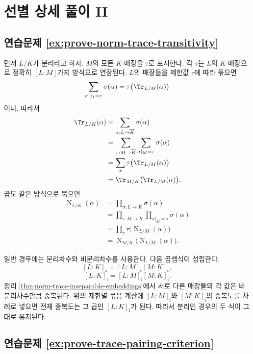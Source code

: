 \clearpage
\section{선별 상세 풀이 II}
\label{sec:norm-trace-solutions-b}

\subsection*{연습문제 \ref{ex:prove-norm-trace-transitivity}}

\begin{solution}
먼저 $L/K$가 분리라고 하자. $M$의 모든 $K$-매장을 $\tau$로 표시한다. 각 $\tau$는 $L$의 $K$-매장으로 정확히 $[L:M]$가지 방식으로 연장된다. $L$의 매장들을 제한값 $\tau$에 따라 묶으면
\[
  \sum_{\sigma|_M=\tau}\sigma(\alpha)
  =\tau\bigl(\Tr_{L/M}(\alpha)\bigr)
\]
이다. 따라서
\[
\begin{aligned}
  \Tr_{L/K}(\alpha)
  &=\sum_{\sigma:L\to\overline K}\sigma(\alpha)\\
  &=\sum_{\tau:M\to\overline K}
    \sum_{\sigma|_M=\tau}\sigma(\alpha)\\
  &=\sum_\tau\tau\bigl(\Tr_{L/M}(\alpha)\bigr)\\
  &=\Tr_{M/K}\bigl(\Tr_{L/M}(\alpha)\bigr).
\end{aligned}
\]
곱도 같은 방식으로 묶으면
\[
\begin{aligned}
  \operatorname N_{L/K}(\alpha)
  &=\prod_{\sigma:L\to\overline K}\sigma(\alpha)\\
  &=\prod_{\tau:M\to\overline K}
    \prod_{\sigma|_M=\tau}\sigma(\alpha)\\
  &=\prod_\tau\tau\bigl(\operatorname N_{L/M}(\alpha)\bigr)\\
  &=\operatorname N_{M/K}
    \bigl(\operatorname N_{L/M}(\alpha)\bigr).
\end{aligned}
\]

일반 경우에는 분리차수와 비분리차수를 사용한다. 다음 곱셈식이 성립한다.
\[
  [L:K]_{\mathrm s}
  =[L:M]_{\mathrm s}[M:K]_{\mathrm s},
\]
\[
  [L:K]_{\mathrm i}
  =[L:M]_{\mathrm i}[M:K]_{\mathrm i}.
\]
정리 \ref{thm:norm-trace-inseparable-embeddings}에서 서로 다른 매장들의 각 값은 비분리차수만큼 중복된다. 위의 제한별 묶음 계산에 $[L:M]_{\mathrm i}$와 $[M:K]_{\mathrm i}$의 중복도를 차례로 넣으면 전체 중복도는 그 곱인 $[L:K]_{\mathrm i}$가 된다. 따라서 분리인 경우의 두 식이 그대로 유지된다.
\end{solution}

\subsection*{연습문제 \ref{ex:prove-trace-pairing-criterion}}


